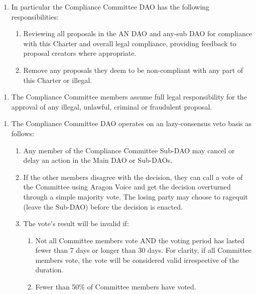 \begin{enumerate}
\begin{enumerate}
	\end{enumerate}
	
	\begin{enumerate}
		
		\begin{enumerate}
			
			\item In particular the Compliance Committee \ac{DAO} has the following
			responsibilities:
			\begin{enumerate}
				\item Reviewing all proposals in the AN \ac{DAO} and any-sub \ac{DAO} for
				compliance with this Charter and overall legal compliance,
				providing feedback to proposal creators where appropriate.
				\item Remove any proposals they deem to be non-compliant with any
				part of this Charter or illegal.
			\end{enumerate}
		
		\end{enumerate}

		\begin{enumerate}
			\item The Compliance Committee members assume full legal responsibility for the approval of any illegal, unlawful, criminal or fraudulent proposal.
		\end{enumerate}
	
		\begin{enumerate}
			
			\item The Compliance Committee \ac{DAO} operates on an lazy-consensus veto basis as follows:
			\begin{enumerate}
				
				\item Any member of the Compliance Committee Sub-\ac{DAO} may cancel or delay an action in the Main \ac{DAO} or Sub-\acp{DAO}.
				\item If the other members disagree with the decision, they can call a vote of the Committee using Aragon Voice and get the decision overturned through a simple majority vote.
				The losing party may choose to ragequit (leave the Sub-\ac{DAO}) before the decision is enacted.
				\item The vote’s result will be invalid if:
				\begin{enumerate}
					\item Not all Committee members vote AND the voting period
					has lasted fewer than 7 days or longer than 30 days.
					For clarity, if all Committee members vote, the vote will be considered valid irrespective of the duration.
					\item Fewer than 50\% of Committee members have voted.
				\end{enumerate}
			

\end{enumerate}
\end{enumerate}
\end{enumerate}
\end{enumerate}
